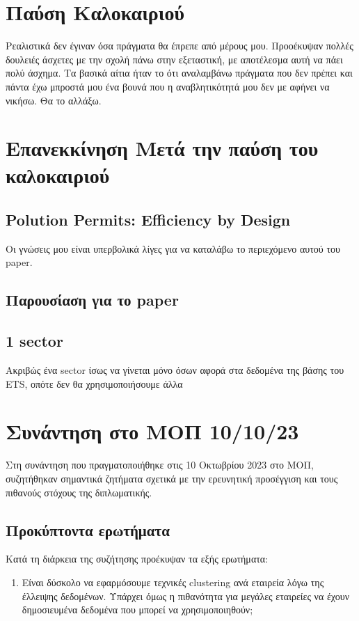 \documentclass[a4paper,twoside,10pt]{article}
\begin{document}
\section{Παύση Καλοκαιριού}
Ρεαλιστικά δεν έγιναν όσα πράγματα θα έπρεπε από μέρους μου. Προοέκυψαν πολλές δουλειές άσχετες με την σχολή πάνω στην εξεταστική, με αποτέλεσμα αυτή να πάει πολύ άσχημα. Τα βασικά αίτια ήταν το ότι αναλαμβάνω πράγματα που δεν πρέπει και πάντα έχω μπροστά μου ένα βουνά που η αναβλητικότητά μου δεν με αφήνει να νικήσω. Θα το αλλάξω. 

\section{Επανεκκίνηση Μετά την παύση του καλοκαιριού}



\subsection{Polution Permits: Efficiency by Design}
Οι γνώσεις μου είναι υπερβολικά λίγες για να καταλάβω το περιεχόμενο αυτού του paper.

\subsection{Παρουσίαση για το paper}

	
  
\subsection{1 sector}
Ακριβώς ένα sector ίσως να γίνεται μόνο όσων αφορά στα δεδομένα της βάσης του ETS, οπότε δεν θα χρησιμοποιήσουμε άλλα 
	
\section{Συνάντηση στο ΜΟΠ 10/10/23}
Στη συνάντηση που πραγματοποιήθηκε στις 10 Οκτωβρίου 2023 στο ΜΟΠ, συζητήθηκαν σημαντικά ζητήματα σχετικά με την ερευνητική προσέγγιση και τους πιθανούς στόχους της διπλωματικής.

\subsection{Προκύπτοντα ερωτήματα}
Κατά τη διάρκεια της συζήτησης προέκυψαν τα εξής ερωτήματα:

\begin{enumerate}
	\item Είναι δύσκολο να εφαρμόσουμε τεχνικές clustering ανά εταιρεία λόγω της έλλειψης δεδομένων. Υπάρχει όμως η πιθανότητα για μεγάλες εταιρείες να έχουν δημοσιευμένα δεδομένα που μπορεί να χρησιμοποιηθούν;
\end{enumerate}
\end{document}
